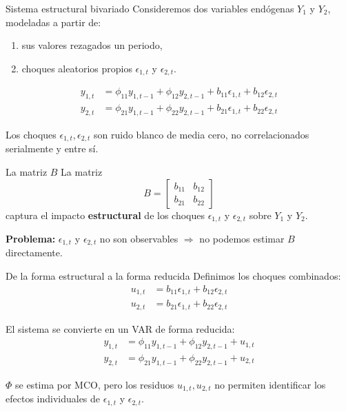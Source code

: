 \documentclass[11pt]{beamer}
\begin{document}
\begin{frame}{Sistema estructural bivariado}
Consideremos dos variables endógenas $Y_1$ y $Y_2$, modeladas a partir de:
\begin{enumerate}
    \item sus valores rezagados un periodo,
    \item choques aleatorios propios $\epsilon_{1,t}$ y $\epsilon_{2,t}$.
\end{enumerate}

\begin{align*}
y_{1,t} &= \phi_{11} y_{1,t-1} + \phi_{12} y_{2,t-1} + b_{11}\epsilon_{1,t} + b_{12}\epsilon_{2,t}\\
y_{2,t} &= \phi_{21} y_{1,t-1} + \phi_{22} y_{2,t-1} + b_{21}\epsilon_{1,t} + b_{22}\epsilon_{2,t}
\end{align*}

Los choques $\epsilon_{1,t}, \epsilon_{2,t}$ son ruido blanco de media cero, no correlacionados serialmente y entre sí.
\end{frame}

\begin{frame}{La matriz $B$}
La matriz
\[
B = \begin{bmatrix} b_{11} & b_{12} \\ b_{21} & b_{22} \end{bmatrix}
\]
captura el impacto \textbf{estructural} de los choques $\epsilon_{1,t}$ y $\epsilon_{2,t}$ sobre $Y_1$ y $Y_2$.

\vspace{0.5cm}
\textbf{Problema:} $\epsilon_{1,t}$ y $\epsilon_{2,t}$ no son observables $\Rightarrow$ no podemos estimar $B$ directamente.
\end{frame}

\begin{frame}{De la forma estructural a la forma reducida}
Definimos los choques combinados:
\begin{align*}
u_{1,t} &= b_{11}\epsilon_{1,t} + b_{12}\epsilon_{2,t}\\
u_{2,t} &= b_{21}\epsilon_{1,t} + b_{22}\epsilon_{2,t}
\end{align*}

El sistema se convierte en un VAR de forma reducida:
\begin{align*}
y_{1,t} &= \phi_{11} y_{1,t-1} + \phi_{12} y_{2,t-1} + u_{1,t}\\
y_{2,t} &= \phi_{21} y_{1,t-1} + \phi_{22} y_{2,t-1} + u_{2,t}
\end{align*}

$\Phi$ se estima por MCO, pero los residuos $u_{1,t}, u_{2,t}$ no permiten identificar los efectos individuales de $\epsilon_{1,t}$ y $\epsilon_{2,t}$.
\end{frame}
\end{document}
